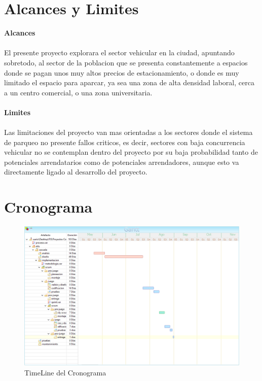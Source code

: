 \section{Alcances y Limites}
\large \textbf{Alcances}  \\
\\
El presente proyecto explorara el sector vehicular en la ciudad, apuntando sobretodo, al sector de la poblacion que se presenta constantemente a espacios donde se pagan unos muy altos precios de estacionamiento, o donde es muy limitado el espacio para aparcar, ya sea una zona de alta densidad laboral, cerca a un centro comercial, o una zona universitaria.
\\
\\
\large \textbf{Limites}  \\
\\
Las limitaciones del proyecto van mas orientadas a los sectores donde el sistema de parqueo no presente fallos criticos, es decir, sectores con baja concurrencia vehicular no se contemplan dentro del proyecto por su baja probabilidad tanto de potenciales arrendatarios como de potenciales arrendadores, aunque esto va directamente ligado al desarrollo del proyecto. 
\newpage

\section{Cronograma}
\begin{figure}[h!]
	\centering
	\includegraphics[width=1.1\linewidth]{imgs/CronogramaColoso.png}
	\caption[Cronograma]{TimeLine del Cronograma}
\end{figure}

